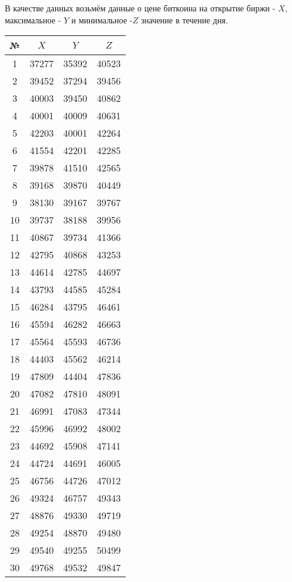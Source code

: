 \documentclass[utf8, a4paper, 14pt, russian, oneside]{book}
\begin{document}


\tableofcontents
\newpage


В качестве данных возьмём данные о цене биткоина на открытие биржи - $X$, максимальное - $Y$ и минимальное -$Z$ значение в течение дня.
\begin{table}[h!]
    \centering
    \begin{tabular}{|c|c|c|c|}
        \hline
        № & $X$ & $Y$ & $Z$ \\ \hline
        1 & 37277 & 35392 & 40523 \\ \hline
        2 & 39452 & 37294 & 39456 \\ \hline
        3 & 40003 & 39450 & 40862 \\ \hline
        4 & 40001 & 40009 & 40631 \\ \hline
        5 & 42203 & 40001 & 42264 \\ \hline
        6 & 41554 & 42201 & 42285 \\ \hline
        7 & 39878 & 41510 & 42565 \\ \hline
        8 & 39168 & 39870 & 40449 \\ \hline
        9 & 38130 & 39167 & 39767 \\ \hline
        10 & 39737 & 38188 & 39956 \\ \hline
        11 & 40867 & 39734 & 41366 \\ \hline
        12 & 42795 & 40868 & 43253 \\ \hline
        13 & 44614 & 42785 & 44697 \\ \hline
        14 & 43793 & 44585 & 45284 \\ \hline
        15 & 46284 & 43795 & 46461 \\ \hline
        16 & 45594 & 46282 & 46663 \\ \hline
        17 & 45564 & 45593 & 46736 \\ \hline
        18 & 44403 & 45562 & 46214 \\ \hline
        19 & 47809 & 44404 & 47836 \\ \hline
        20 & 47082 & 47810 & 48091 \\ \hline
        21 & 46991 & 47083 & 47344 \\ \hline
        22 & 45996 & 46992 & 48002 \\ \hline
        23 & 44692 & 45908 & 47141 \\ \hline
        24 & 44724 & 44691 & 46005 \\ \hline
        25 & 46756 & 44726 & 47012 \\ \hline
        26 & 49324 & 46757 & 49343 \\ \hline
        27 & 48876 & 49330 & 49719 \\ \hline
        28 & 49254 & 48870 & 49480 \\ \hline
        29 & 49540 & 49255 & 50499 \\ \hline
        30 & 49768 & 49532 & 49847 \\ \hline
    \end{tabular} 
\end{table}

\newpage
{}
\end{document}
